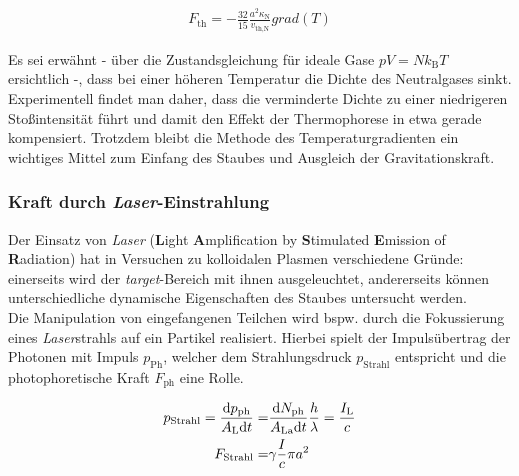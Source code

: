 \documentclass[numbers=noenddot,a4paper]{scrartcl}
\newcommand{\diff}{\textnormal{d}}
\newcommand{\ix}[1]{_\text{#1}}
\newcommand{\tilt}[1]{\textit{#1}}
\newcommand{\grad}[1]{\textit{grad}\left(#1\right)}
\newcommand{\fett}[1]{\textbf{#1}}
\begin{document}
					\begin{align}
						F\ix{th}=-\frac{32}{15}\frac{a^2 \kappa\ix{N}}{v\ix{th,N}}\grad{T} \label{eq:therm}
					\end{align}
					
				Es sei erwähnt -  über die Zustandsgleichung für ideale Gase $pV=Nk\ix{B}T$ ersichtlich -, dass bei einer höheren Temperatur die Dichte des Neutralgases sinkt. Experimentell findet man daher, dass die verminderte Dichte zu einer niedrigeren Stoßintensität führt und damit den Effekt der Thermophorese in etwa gerade kompensiert. Trotzdem bleibt die Methode des Temperaturgradienten ein wichtiges Mittel zum Einfang des Staubes und Ausgleich der Gravitationskraft.
					
			\subsubsection{Kraft durch \tilt{Laser}-Einstrahlung}
			
				Der Einsatz von \tilt{Laser} (\fett{L}ight \fett{A}mplification by \fett{S}timulated \fett{E}mission of \fett{R}adiation) hat in Versuchen zu kolloidalen Plasmen verschiedene Gründe: einerseits wird der \tilt{target}-Bereich mit ihnen ausgeleuchtet, andererseits können unterschiedliche dynamische Eigenschaften des Staubes untersucht werden.\\
				Die Manipulation von eingefangenen Teilchen wird bspw. durch die Fokussierung eines \tilt{Laser}strahls auf ein Partikel realisiert. Hierbei spielt der Impulsübertrag der Photonen mit Impuls $p\ix{Ph}$, welcher dem Strahlungsdruck $p\ix{Strahl}$ entspricht und die photophoretische Kraft $F\ix{ph}$ eine Rolle.
				
					\begin{align}
						p\ix{Strahl}=\frac{\diff p\ix{ph}}{A\ix{L}\diff t}=&\frac{\diff N\ix{ph}}{A\ix{La}\diff t}\frac{h}{\lambda}=\frac{I\ix{L}}{c} \nonumber \\
						F\ix{Strahl}=&\gamma\frac{I}{c}\pi a^2 \label{eq:strahl}
					\end{align}
					
\end{document}

